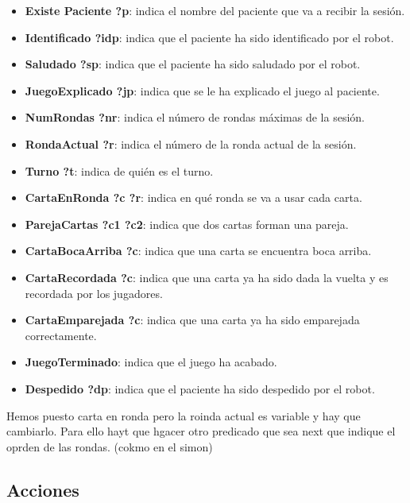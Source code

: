 \documentclass{uc3mpracticas}
\begin{document}
  \begin{itemize}
    \item \textbf{Existe Paciente ?p}: indica el nombre del paciente que va a recibir la sesión.
    \item \textbf{Identificado ?idp}: indica que el paciente ha sido identificado por el robot.
    \item \textbf{Saludado ?sp}: indica que el paciente ha sido saludado por el robot.
    \item \textbf{JuegoExplicado ?jp}: indica que se le ha explicado el juego al paciente.
    \item \textbf{NumRondas ?nr}: indica el número de rondas máximas de la sesión.
    \item \textbf{RondaActual ?r}: indica el número de la ronda actual de la sesión.
    \item \textbf{Turno ?t}: indica de quién es el turno.
    \item \textbf{CartaEnRonda ?c ?r}: indica en qué ronda se va a usar cada carta.
    \item \textbf{ParejaCartas ?c1 ?c2}: indica que dos cartas forman una pareja.
    \item \textbf{CartaBocaArriba ?c}: indica que una  carta se encuentra boca arriba.
    \item \textbf{CartaRecordada ?c}: indica que una carta ya ha sido dada la vuelta y es recordada por los jugadores.
    \item \textbf{CartaEmparejada ?c}: indica que una carta ya ha sido emparejada correctamente.
    \item \textbf{JuegoTerminado}: indica que el juego ha acabado.
    \item \textbf{Despedido ?dp}: indica que el paciente ha sido despedido por el robot.
  \end{itemize}

  Hemos puesto carta en ronda pero la roinda actual es variable y hay que cambiarlo. Para ello hayt que hgacer otro predicado que sea next que indique el oprden de las rondas. (cokmo en el simon)


  \subsection{Acciones}
\end{document}
